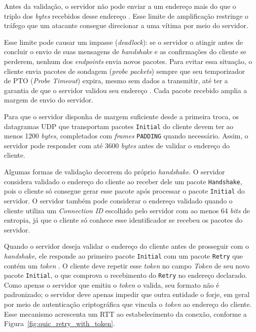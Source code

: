 Antes da validação, o servidor não pode enviar a um endereço mais do que o triplo dos \textit{bytes} recebidos desse endereço \citep{rfc9000}. Esse limite de amplificação restringe o tráfego que um atacante consegue direcionar a uma vítima por meio do servidor.

Esse limite pode causar um impasse (\textit{deadlock}): se o servidor o atingir antes de concluir o envio de suas mensagens de \textit{handshake} e as confirmações do cliente se perderem, nenhum dos \textit{endpoints} envia novos pacotes. Para evitar essa situação, o cliente envia pacotes de sondagem (\textit{probe packets}) sempre que seu temporizador de PTO (\textit{Probe Timeout}) expira, mesmo sem dados a transmitir, até ter a garantia de que o servidor validou seu endereço \citep{rfc9002}. Cada pacote recebido amplia a margem de envio do servidor.

Para que o servidor disponha de margem suficiente desde a primeira troca, os datagramas UDP que transportam pacotes \texttt{Initial} do cliente devem ter ao menos 1200 \textit{bytes}, completados com \textit{frames} \texttt{PADDING} quando necessário. Assim, o servidor pode responder com até 3600 \textit{bytes} antes de validar o endereço do cliente.

Algumas formas de validação decorrem do próprio \textit{handshake}. O servidor considera validado o endereço do cliente ao receber dele um pacote \texttt{Handshake}, pois o cliente só consegue gerar esse pacote após processar o pacote \texttt{Initial} do servidor. O servidor também pode considerar o endereço validado quando o cliente utiliza um \textit{Connection ID} escolhido pelo servidor com ao menos 64 \textit{bits} de entropia, já que o cliente só conhece esse identificador se recebeu os pacotes do servidor.

Quando o servidor deseja validar o endereço do cliente antes de prosseguir com o \textit{handshake}, ele responde ao primeiro pacote \texttt{Initial} com um pacote \texttt{Retry} que contém um \textit{token} \citep{rfc9000}. O cliente deve repetir esse \textit{token} no campo \textit{Token} de seu novo pacote \texttt{Initial}, o que comprova o recebimento do \texttt{Retry} no endereço declarado. Como apenas o servidor que emitiu o \textit{token} o valida, seu formato não é padronizado; o servidor deve apenas impedir que outra entidade o forje, em geral por meio de autenticação criptográfica que vincula o \textit{token} ao endereço do cliente. Esse mecanismo acrescenta um RTT ao estabelecimento da conexão, conforme a Figura~\ref{fig:quic_retry_with_token}.

